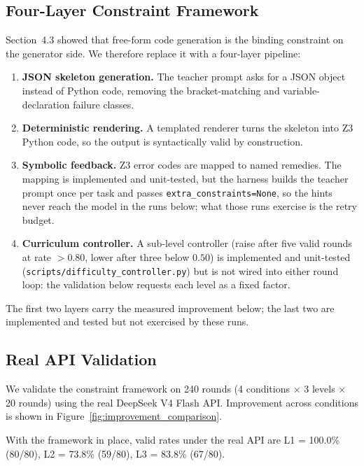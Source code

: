\documentclass{article}
\begin{document}
\subsection{Four-Layer Constraint Framework}
\label{sec:fourlayer}

Section~4.3 showed that free-form code generation is the binding constraint on the generator side. We
therefore replace it with a four-layer pipeline:

\begin{enumerate}
  \item \textbf{JSON skeleton generation.} The teacher prompt asks for a JSON object instead of
        Python code, removing the bracket-matching and variable-declaration failure classes.
  \item \textbf{Deterministic rendering.} A templated renderer turns the skeleton into Z3 Python
        code, so the output is syntactically valid by construction.
  \item \textbf{Symbolic feedback.} Z3 error codes are mapped to named remedies. The mapping is
        implemented and unit-tested, but the harness builds the teacher prompt once per task and
        passes \texttt{extra\_constraints=None}, so the hints never reach the model in the runs below;
        what those runs exercise is the retry budget.
  \item \textbf{Curriculum controller.} A sub-level controller (raise after five valid rounds at rate
        $> 0.80$, lower after three below $0.50$) is implemented and unit-tested
        (\texttt{scripts/difficulty\_controller.py}) but is not wired into either round loop: the
        validation below requests each level as a fixed factor.
\end{enumerate}

The first two layers carry the measured improvement below; the last two are implemented and tested
but not exercised by these runs.

\subsection{Real API Validation}
\label{sec:api}

We validate the constraint framework on 240 rounds (4 conditions $\times$ 3 levels $\times$ 20
rounds) using the real DeepSeek V4 Flash API. Improvement across conditions is shown in
Figure~\ref{fig:improvement_comparison}.

With the framework in place, valid rates under the real API are L1 = 100.0\% (80/80), L2 = 73.8\%
(59/80), L3 = 83.8\% (67/80).
\end{document}

